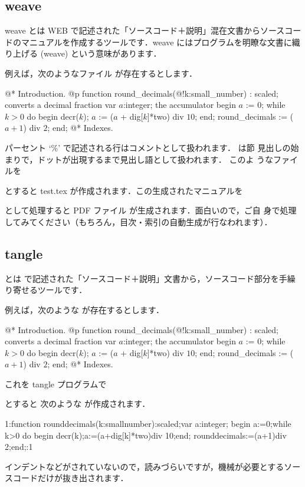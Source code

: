 \subsection{weave}

weave とは WEB で記述された「ソースコード＋説明」混在文書からソースコー
ドのマニュアルを作成するツールです．weave にはプログラムを明瞭な文書に織
り上げる (weave) という意味があります．

例えば，次のようなファイル  が存在するとします．
\begin{Pascaly}
@* Introduction.
@p function round_decimals(@!k:small_number) : scaled; {converts a decimal fraction}
var $a$:integer; {the accumulator}
begin $a$ := $0$;
  while $k > 0$ do
    begin decr($k$); $a$ := ($a$ + dig[$k$]*two) div $10$; 
    end;
  round_decimals := ($a + 1$) div $2$; 
end;
@* Indexes.
\end{Pascaly}
パーセント `\%' で記述される行はコメントとして扱われます． は節
見出しの始まりで，ドットが出現するまで見出し語として扱われます． このよ
うなファイルを
\begin{InTerm}
\end{InTerm}
とすると test.tex が作成されます．この生成されたマニュアルを
\begin{InTerm}
\end{InTerm}
として処理すると PDF ファイル  が生成されます．面白いので，ご自
身で処理してみてください（もちろん，目次・索引の自動生成が行なわれます）．


\subsection{tangle}

 とは  で記述された「ソースコード＋説明」文書から，ソースコード部分を手繰り寄せるツールです．

例えば，次のような  が存在するとします．
\begin{Pascaly}
@* Introduction.
@p function round_decimals(@!k:small_number) : scaled; {converts a decimal fraction}
var $a$:integer; {the accumulator}
begin $a$ := $0$;
  while $k > 0$ do
    begin decr($k$); $a$ := ($a$ + dig[$k$]*two) div $10$; 
    end;
  round_decimals := ($a + 1$) div $2$; 
end;
@* Indexes.
\end{Pascaly}

これを tangle プログラムで
\begin{InTerm}
\end{InTerm}
とすると 次のような  が作成されます．
\begin{InText}
{1:}function rounddecimals(k:smallnumber):scaled;var a:integer;
begin a:=0;while k>0 do begin decr(k);a:=(a+dig[k]*two)div 10;end;
rounddecimals:=(a+1)div 2;end;{:1}
\end{InText}
インデントなどがされていないので，読みづらいですが，機械が必要とするソー
スコードだけが抜き出されます．



